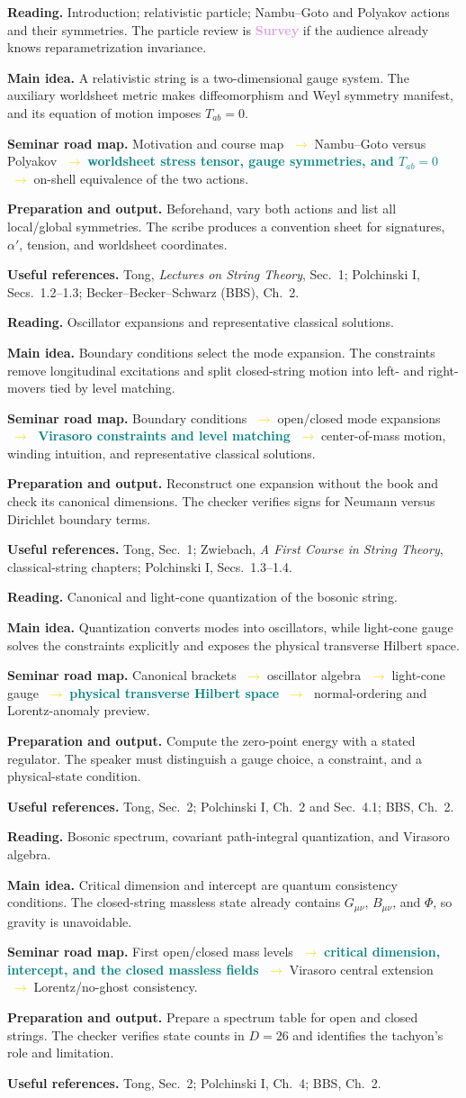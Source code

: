 \documentclass[11pt]{article}
\newcommand{\survey}{\textcolor{plum}{\textbf{Survey}}}
\newcommand{\essential}[1]{\textcolor{teal}{\textbf{#1}}}
\newcommand{\roadarrow}{\textcolor{gold}{\ensuremath{\;\longrightarrow\;}}}
\newcommand{\seminarweek}[7]{%
  \begin{tcolorbox}[
    enhanced,
    colback=white,colframe=navy,
    boxrule=0.65pt,arc=1.5mm,
    left=3mm,right=3mm,top=2mm,bottom=2mm,
    title={#1\hfill\normalfont #2},
    fonttitle=\bfseries,coltitle=white,colbacktitle=navy
  ]
  \textbf{Reading.} #3

  \textbf{Main idea.} #4

  \textbf{Seminar road map.} #5

  \textbf{Preparation and output.} #6

  \textbf{Useful references.} #7
  \end{tcolorbox}
}
\begin{document}
\seminarweek{Week 1}{Chs.~1; 2.1--2.3, pp.~1--22}
{Introduction; relativistic particle; Nambu--Goto and Polyakov actions and their
symmetries.  The particle review is \survey{} if the audience already knows
reparametrization invariance.}
{A relativistic string is a two-dimensional gauge system.  The auxiliary
worldsheet metric makes diffeomorphism and Weyl symmetry manifest, and its
equation of motion imposes $T_{ab}=0$.}
{Motivation and course map \roadarrow Nambu--Goto versus Polyakov
\roadarrow \essential{worldsheet stress tensor, gauge symmetries, and
$T_{ab}=0$} \roadarrow on-shell equivalence of the two actions.}
{Beforehand, vary both actions and list all local/global symmetries.  The scribe
produces a convention sheet for signatures, $\alpha'$, tension, and worldsheet
coordinates.}
{Tong, \emph{Lectures on String Theory}, Sec.~1; Polchinski I, Secs.~1.2--1.3;
Becker--Becker--Schwarz (BBS), Ch.~2.}

\seminarweek{Week 2}{Ch.~2.4--2.5, pp.~23--34}
{Oscillator expansions and representative classical solutions.}
{Boundary conditions select the mode expansion.  The constraints remove
longitudinal excitations and split closed-string motion into left- and
right-movers tied by level matching.}
{Boundary conditions \roadarrow open/closed mode expansions \roadarrow
\essential{Virasoro constraints and level matching} \roadarrow center-of-mass
motion, winding intuition, and representative classical solutions.}
{Reconstruct one expansion without the book and check its canonical dimensions.
The checker verifies signs for Neumann versus Dirichlet boundary terms.}
{Tong, Sec.~1; Zwiebach, \emph{A First Course in String Theory}, classical-string
chapters; Polchinski I, Secs.~1.3--1.4.}

\seminarweek{Week 3}{Ch.~3.1--3.2, pp.~35--45}
{Canonical and light-cone quantization of the bosonic string.}
{Quantization converts modes into oscillators, while light-cone gauge solves
the constraints explicitly and exposes the physical transverse Hilbert space.}
{Canonical brackets \roadarrow oscillator algebra \roadarrow light-cone gauge
\roadarrow \essential{physical transverse Hilbert space} \roadarrow
normal-ordering and Lorentz-anomaly preview.}
{Compute the zero-point energy with a stated regulator.  The speaker must
distinguish a gauge choice, a constraint, and a physical-state condition.}
{Tong, Sec.~2; Polchinski I, Ch.~2 and Sec.~4.1; BBS, Ch.~2.}

\seminarweek{Week 4}{Ch.~3.3--3.5, pp.~46--62}
{Bosonic spectrum, covariant path-integral quantization, and Virasoro algebra.}
{Critical dimension and intercept are quantum consistency conditions.  The
closed-string massless state already contains $G_{\mu\nu}$, $B_{\mu\nu}$, and
$\Phi$, so gravity is unavoidable.}
{First open/closed mass levels \roadarrow \essential{critical dimension,
intercept, and the closed massless fields} \roadarrow Virasoro central extension
\roadarrow Lorentz/no-ghost consistency.}
{Prepare a spectrum table for open and closed strings.  The checker verifies
state counts in $D=26$ and identifies the tachyon's role and limitation.}
{Tong, Sec.~2; Polchinski I, Ch.~4; BBS, Ch.~2.}
\end{document}
